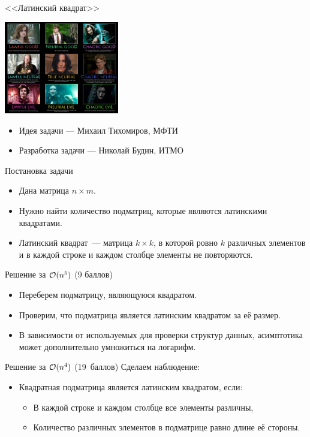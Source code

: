 \begin{frame}
  \begin{center}
    \LARGE <<Латинский квадрат>>
  \end{center}
  \begin{center}
      \includegraphics[width=5cm]{memes/h-meme.jpg}
  \end{center}
  \begin{itemize}
  \item Идея задачи --- Михаил Тихомиров, МФТИ
  \item Разработка задачи --- Николай Будин, ИТМО
  \end{itemize}
\end{frame}

\begin{frame}{Постановка задачи}

  \begin{itemize}
  \item Дана матрица $n \times m$.
  \item Нужно найти количество подматриц, которые являются латинскими квадратами.
  \item Латинский квадрат~--- матрица $k \times k$, в которой ровно $k$ различных элементов и в каждой строке и каждом столбце элементы не повторяются.
  \end{itemize}
  
\end{frame}

\begin{frame}{Решение за $\mathcal{O}(n ^ 5)$ (9 баллов)}
  \begin{itemize}
  \item Переберем подматрицу, являющуюся квадратом.
  \item Проверим, что подматрица является латинским квадратом за её размер.
  \item В зависимости от используемых для проверки структур данных, асимптотика может дополнительно умножиться на логарифм.
  \end{itemize}
\end{frame}

\begin{frame}{Решение за $\mathcal{O}(n ^ 4)$ (19~баллов)}
  Сделаем наблюдение:
  
  \begin{itemize}
  \item Квадратная подматрица является латинским квадратом, если:
  \begin{itemize}
  \item В каждой строке и каждом столбце все элементы различны,
  \item Количество различных элементов в подматрице равно длине её стороны.
  \end{itemize}
  \end{itemize}
\end{frame}


